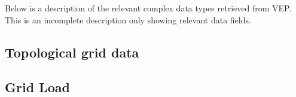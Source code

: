 Below is a description of the relevant complex data types retrieved from VEP. This is an incomplete
description only showing relevant data fields.




\vspace{1cm}



\subsection{Topological grid data}






\subsection{Grid Load}


